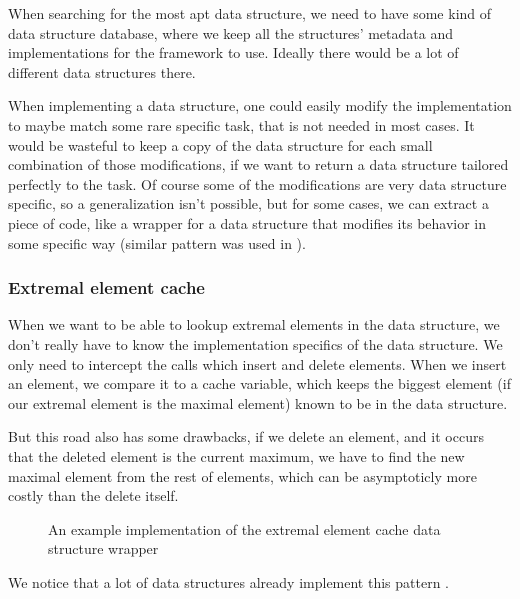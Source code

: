 \documentclass[a4paper,11pt]{article}
\begin{document}
		When searching for the most apt data structure, we need to have some kind of data structure database,
		where we keep all the structures' metadata and implementations for the framework to use. Ideally there
		would be a lot of different data structures there.

		When implementing a data structure, one could easily modify the implementation to maybe match some rare
		specific task, that is not needed in most cases. It would be wasteful to keep a copy of the data
		structure for each small combination of those modifications, if we want to return a data structure
		tailored perfectly to the task. Of course some of the modifications are very data structure specific, so
		a generalization isn't possible, but for some cases, we can extract a piece of code, like a wrapper for
        a data structure that modifies its behavior in some specific way (similar pattern was used in
        \cite{Okasaki}).

		\subsubsection{Extremal element cache}

			When we want to be able to lookup extremal elements in the data structure, we don't really have
			to know the implementation specifics of the data structure. We only need to intercept the calls
			which insert and delete elements. When we insert an element, we compare it to a cache variable,
			which keeps the biggest element (if our extremal element is the maximal element) known to be in
			the data structure.

			But this road also has some drawbacks, if we delete an element, and it occurs that the deleted
			element is the current maximum, we have to find the new maximal element from the rest of
			elements, which can be asymptoticly more costly than the delete itself.


			\begin{figure}
				

				\caption{An example implementation of the extremal element cache data structure wrapper}

				\label{fig:elem-cache}
			\end{figure}

			We notice that a lot of data structures already implement this pattern \cite{Wiveb}.
\end{document}
